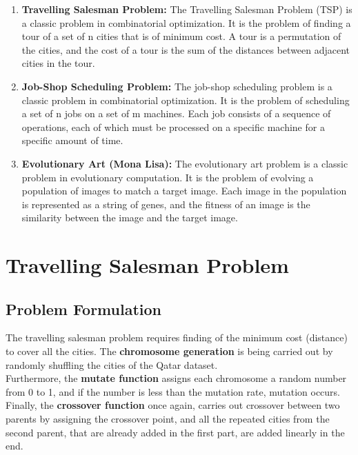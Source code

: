 \documentclass[12pt]{article}
\begin{document}
\begin{enumerate}
    \item \textbf{Travelling Salesman Problem:} The Travelling Salesman Problem (TSP) is a classic problem in combinatorial optimization. It is the problem of finding a tour of a set of n cities that is of minimum cost. A tour is a permutation of the cities, and the cost of a tour is the sum of the distances between adjacent cities in the tour.
    \item \textbf{Job-Shop Scheduling Problem:} The job-shop scheduling problem is a classic problem in combinatorial optimization. It is the problem of scheduling a set of n jobs on a set of m machines. Each job consists of a sequence of operations, each of which must be processed on a specific machine for a specific amount of time.
    \item \textbf{Evolutionary Art (Mona Lisa):} The evolutionary art problem is a classic problem in evolutionary computation. It is the problem of evolving a population of images to match a target image. Each image in the population is represented as a string of genes, and the fitness of an image is the similarity between the image and the target image.
\end{enumerate}

\section{Travelling Salesman Problem}

\subsection{Problem Formulation}

The travelling salesman problem requires finding of the minimum cost (distance) to cover all the cities. The \textbf{chromosome generation} is being carried out by randomly shuffling the cities of the Qatar dataset. 
\newline \\
Furthermore, the \textbf{mutate function} assigns each chromosome a random number from 0 to 1, and if the number is less than the mutation rate, mutation occurs. 
\newline \\
Finally, the \textbf{crossover function} once again, carries out crossover between two parents by assigning the crossover point, and all the repeated cities from the second parent, that are already added in the first part, are added linearly in the end. 
\end{document}

